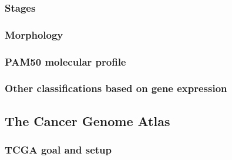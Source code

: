             \subsubsection{Stages}
            \subsubsection{Morphology}
            \subsubsection{PAM50 molecular profile}

            \subsubsection{Other classifications based on gene expression }

        
        
    \subsection{The Cancer Genome Atlas}
        \subsubsection{TCGA goal and setup}
